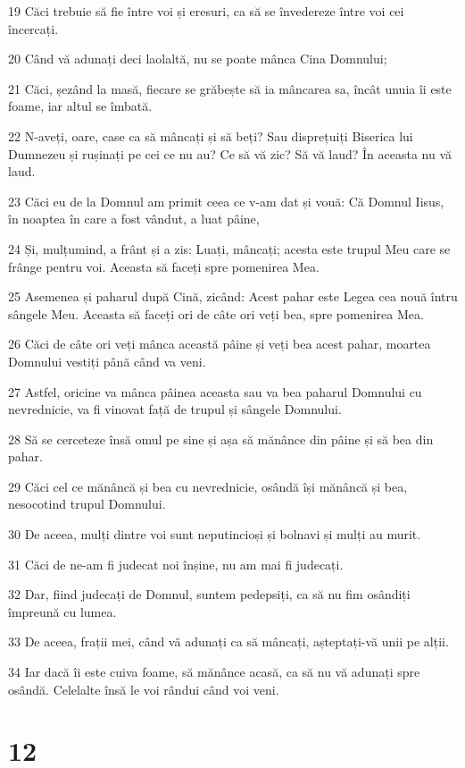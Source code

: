\par 19 Căci trebuie să fie între voi și eresuri, ca să se învedereze între voi cei încercați.
\par 20 Când vă adunați deci laolaltă, nu se poate mânca Cina Domnului;
\par 21 Căci, șezând la masă, fiecare se grăbește să ia mâncarea sa, încât unuia îi este foame, iar altul se îmbată.
\par 22 N-aveți, oare, case ca să mâncați și să beți? Sau disprețuiți Biserica lui Dumnezeu și rușinați pe cei ce nu au? Ce să vă zic? Să vă laud? În aceasta nu vă laud.
\par 23 Căci eu de la Domnul am primit ceea ce v-am dat și vouă: Că Domnul Iisus, în noaptea în care a fost vândut, a luat pâine,
\par 24 Și, mulțumind, a frânt și a zis: Luați, mâncați; acesta este trupul Meu care se frânge pentru voi. Aceasta să faceți spre pomenirea Mea.
\par 25 Asemenea și paharul după Cină, zicând: Acest pahar este Legea cea nouă întru sângele Meu. Aceasta să faceți ori de câte ori veți bea, spre pomenirea Mea.
\par 26 Căci de câte ori veți mânca această pâine și veți bea acest pahar, moartea Domnului vestiți până când va veni.
\par 27 Astfel, oricine va mânca pâinea aceasta sau va bea paharul Domnului cu nevrednicie, va fi vinovat față de trupul și sângele Domnului.
\par 28 Să se cerceteze însă omul pe sine și așa să mănânce din pâine și să bea din pahar.
\par 29 Căci cel ce mănâncă și bea cu nevrednicie, osândă își mănâncă și bea, nesocotind trupul Domnului.
\par 30 De aceea, mulți dintre voi sunt neputincioși și bolnavi și mulți au murit.
\par 31 Căci de ne-am fi judecat noi înșine, nu am mai fi judecați.
\par 32 Dar, fiind judecați de Domnul, suntem pedepsiți, ca să nu fim osândiți împreună cu lumea.
\par 33 De aceea, frații mei, când vă adunați ca să mâncați, așteptați-vă unii pe alții.
\par 34 Iar dacă îi este cuiva foame, să mănânce acasă, ca să nu vă adunați spre osândă. Celelalte însă le voi rândui când voi veni.

\chapter{12}

